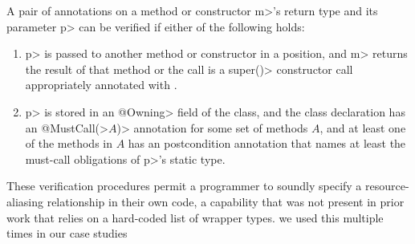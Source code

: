 A pair of \mccannot annotations on a method or constructor \<m>'s return type
and its parameter \<p> can be verified if either of the following holds:
\begin{enumerate}
\item \<p> is passed to another method or constructor in a
  \mccannot position, and \<m> returns the result of that method
  or the call is a \<super()> constructor call appropriately annotated
  with \mccannot.
\item \<p> is stored in an \<@Owning> field of the class, and the
  class declaration has an \<@MustCall(>$A$\<)> annotation for some set
  of methods $A$, and at least one of the methods in $A$ has an
  \EnsuresCalledMethods postcondition annotation that names at least the
  must-call obligations of \<p>'s static type.
\end{enumerate}
These verification procedures permit a programmer to soundly specify a resource-aliasing
relationship in their own code, a capability that was not present in prior work
that relies on a hard-coded list of wrapper types.  we used this
multiple times
in our case studies



